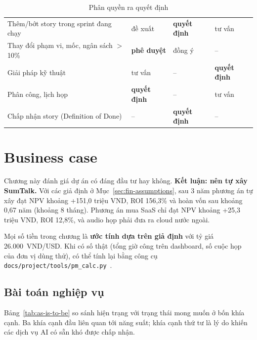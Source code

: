 \documentclass[12pt,a4paper]{report}
\begin{document}
\begin{table}[H]
  \centering
  \caption{Phân quyền ra quyết định}
  \label{tab:decision-rights}
  \small
  \begin{tabularx}{\linewidth}{@{}LQ{2.2cm}Q{2.2cm}Q{2.2cm}@{}}
    \toprule
     &  &  &  \\
    \midrule
    Thêm/bớt story trong sprint đang chạy & đề xuất & \textbf{quyết định} & tư vấn \\
    Thay đổi phạm vi, mốc, ngân sách $>$ 10\% & \textbf{phê duyệt} & đồng ý & -- \\
    Giải pháp kỹ thuật & tư vấn & -- & \textbf{quyết định} \\
    Phân công, lịch họp & \textbf{quyết định} & -- & tư vấn \\
    Chấp nhận story (Definition of Done) & -- & \textbf{quyết định} & -- \\
    \bottomrule
  \end{tabularx}
\end{table}

\chapter{Business case}
\label{chap:business}

Chương này đánh giá dự án có đáng đầu tư hay không. \textbf{Kết luận: nên tự xây SumTalk.} Với các giả định ở
Mục~\ref{sec:fin-assumptions}, sau 3 năm phương án tự xây đạt NPV khoảng +151,0 triệu VND, ROI 156,3\% và hoàn
vốn sau khoảng 0,67 năm (khoảng 8 tháng). Phương án mua SaaS chỉ đạt NPV khoảng +25,3 triệu VND, ROI 12,8\%, và audio họp phải đưa
ra cloud nước ngoài.

Mọi số tiền trong chương là \textbf{ước tính dựa trên giả định} với tỷ giá 26.000~VND/USD. Khi có số thật (tổng
giờ công trên dashboard, số cuộc họp của đơn vị dùng thử), có thể tính lại bằng công cụ
\texttt{docs/project/tools/pm\_calc.py}~\cite{pmcalc}.

\section{Bài toán nghiệp vụ}

Bảng~\ref{tab:as-is-to-be} so sánh hiện trạng với trạng thái mong muốn ở bốn khía cạnh. Ba khía cạnh đầu liên
quan tới năng suất; khía cạnh thứ tư là lý do khiến các dịch vụ AI có sẵn khó được chấp nhận.
\end{document}
